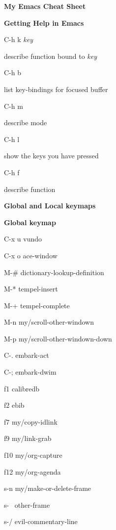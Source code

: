\documentclass[10pt]{article}
\renewcommand\section[1]{\bigskip\par\textbf{\color{heading}\large#1}\smallskip}
\renewcommand\subsection[1]{\smallskip\par\textbf{\color{heading}#1}}
\newcommand\humanreadable[1]{{\par\color{default}\small\sffamily#1}}
\newcommand\meta[1]{\textlangle\textit{#1}\textrangle}
\begin{document}
\author{Jousimies}
\begin{multicols}{4}

  \setlength{\columnsep}{1cm}
  \begin{center}
    \LARGE\color{heading}\textbf{My Emacs Cheat Sheet}
  \end{center}

  \section{Getting Help in Emacs}
  \begin{keylist}
    \item[C-h k \meta{key}] \humanreadable{describe function bound to \meta{key}}
    \item[C-h b] \humanreadable{list key-bindings for focused buffer}
    \item[C-h m] \humanreadable{describe mode}
    \item[C-h l] \humanreadable{show the keys you have pressed}
    \item[C-h f] \humanreadable{describe function}
  \end{keylist}

  \section{Global and Local keymaps}
  \subsection{Global keymap}
  \begin{keylist}
    \item[C-x u] vundo
    \item[C-x o] ace-window
    \item[M-\#] dictionary-lookup-definition
    \item[M-*] tempel-insert
    \item[M-+] tempel-complete
    \item[M-n] my/scroll-other-windown
    \item[M-p] my/scroll-other-windown-down
    \item[C-.] embark-act
    \item[C-;] embark-dwim
    \item[f1] calibredb
    \item[f2] ebib
    \item[f7] my/copy-idlink
    \item[f9] my/link-grab
    \item[f10] my/org-capture
    \item[f12] my/org-agenda
    \item[s-n] my/make-or-delete-frame
    \item[s-~] other-frame
    \item[s-/] evil-commentary-line
  \end{keylist}

\end{multicols}
\end{document}
